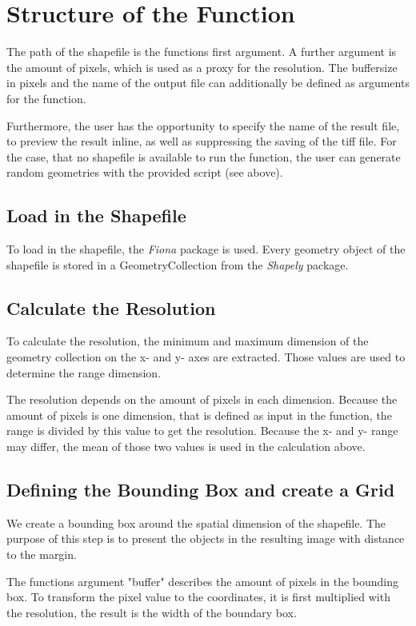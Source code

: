 \documentclass[10pt, a4paper]{article}
\begin{document}
	\section*{Structure of the Function}
	The path of the shapefile is the functions first argument. 
	A further argument is the amount of pixels, which is used as a proxy for the resolution. The buffersize in pixels and the name of the output file can additionally be defined as arguments for the function. 
	
	Furthermore, the user has the opportunity to specify the name of the result file, to preview the result inline, as well as suppressing the saving of the tiff file.
	For the case, that no shapefile is available to run the function, the user can generate random geometries with the provided script (see above).
	
	\subsection*{Load in the Shapefile}
	To load in the shapefile, the \textit{Fiona} package is used. Every geometry object of the shapefile is stored in a GeometryCollection from the \emph{Shapely} package.
	
	\subsection*{Calculate the Resolution}
	To calculate the resolution, the minimum and maximum dimension of the geometry collection on the x- and y- axes are extracted.  Those values are used to determine the range dimension. 
	
	The resolution depends on the amount of pixels in each dimension. Because the amount of pixels is one dimension, that is defined as input in the function, the range is divided by this value to get the resolution. Because the x- and y- range may differ, the mean of those two values is used in the calculation above. 
	
	\subsection*{Defining the Bounding Box and create a Grid}
	We create a bounding box around the spatial dimension of the shapefile. The purpose of this step is to present the objects in the resulting image with distance to the margin.
	
	The functions argument "buffer" describes the amount of pixels in the bounding box.  To transform the pixel value to the coordinates, it is first multiplied with the resolution, the result is the width of the boundary box.
	
\end{document}
